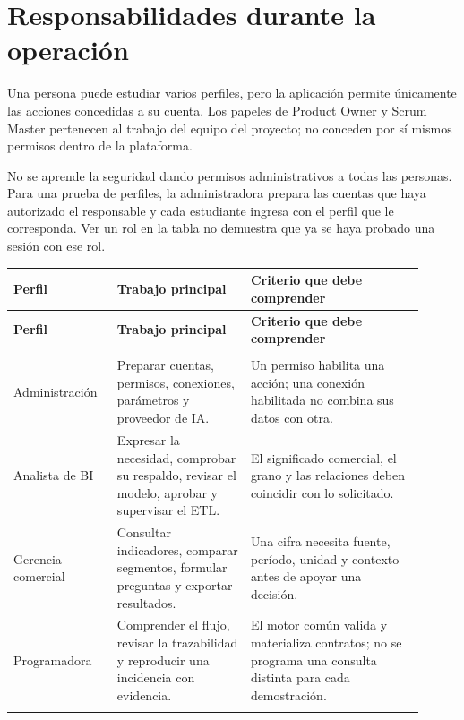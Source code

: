 \section{Responsabilidades durante la operación}
Una persona puede estudiar varios perfiles, pero la aplicación permite únicamente las acciones concedidas a su cuenta. Los papeles de Product Owner y Scrum Master pertenecen al trabajo del equipo del proyecto; no conceden por sí mismos permisos dentro de la plataforma.

No se aprende la seguridad dando permisos administrativos a todas las personas. Para una prueba de perfiles, la administradora prepara las cuentas que haya autorizado el responsable y cada estudiante ingresa con el perfil que le corresponda. Ver un rol en la tabla no demuestra que ya se haya probado una sesión con ese rol.

\begingroup
\fontsize{10}{12.5}\selectfont
\setlength{\tabcolsep}{5pt}
\renewcommand{\arraystretch}{1.15}
\begin{longtable}{@{}>{\RaggedRight\arraybackslash}p{0.22\linewidth}>{\RaggedRight\arraybackslash}p{0.3\linewidth}>{\RaggedRight\arraybackslash}p{0.39\linewidth}@{}}
\toprule
\textbf{Perfil} & \textbf{Trabajo principal} & \textbf{Criterio que debe comprender} \\
\midrule
\endfirsthead
\toprule
\textbf{Perfil} & \textbf{Trabajo principal} & \textbf{Criterio que debe comprender} \\
\midrule
\endhead
\midrule
\multicolumn{3}{r}{\footnotesize Continúa en la página siguiente}\\
\endfoot
\bottomrule
\endlastfoot
Administración & Preparar cuentas, permisos, conexiones, parámetros y proveedor de IA. & Un permiso habilita una acción; una conexión habilitada no combina sus datos con otra. \\
\addlinespace[3pt]
Analista de BI & Expresar la necesidad, comprobar su respaldo, revisar el modelo, aprobar y supervisar el ETL. & El significado comercial, el grano y las relaciones deben coincidir con lo solicitado. \\
\addlinespace[3pt]
Gerencia comercial & Consultar indicadores, comparar segmentos, formular preguntas y exportar resultados. & Una cifra necesita fuente, período, unidad y contexto antes de apoyar una decisión. \\
\addlinespace[3pt]
Programadora & Comprender el flujo, revisar la trazabilidad y reproducir una incidencia con evidencia. & El motor común valida y materializa contratos; no se programa una consulta distinta para cada demostración. \\
\addlinespace[3pt]
\end{longtable}
\endgroup

